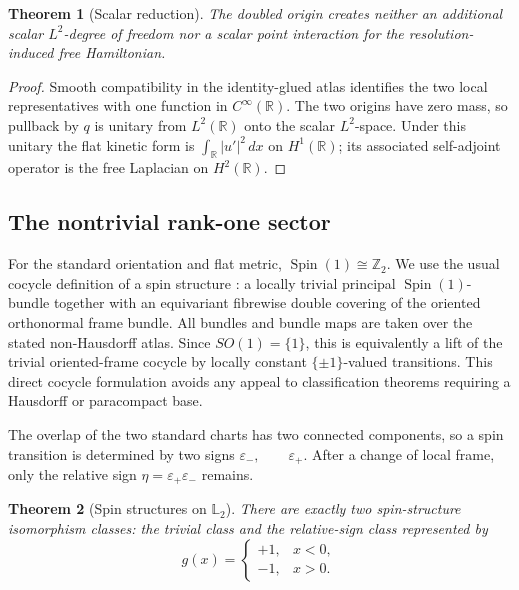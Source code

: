 \documentclass[11pt]{article}
\theoremstyle{plain}
\newtheorem{theorem}{Theorem}[section]
\theoremstyle{definition}
\newcommand{\Ltwo}{\mathbb{L}_{2}}
\begin{document}
\begin{theorem}[Scalar reduction]
\label{thm:L2-scalar-blindness}
The doubled origin creates neither an additional scalar \(L^2\)-degree of
freedom nor a scalar point interaction for the resolution-induced free
Hamiltonian.
\end{theorem}

\begin{proof}
Smooth compatibility in the identity-glued atlas identifies the two local
representatives with one function in \(C^\infty(\mathbb R)\). The two origins
have zero mass, so pullback by \(q\) is unitary from \(L^2(\mathbb R)\) onto
the scalar \(L^2\)-space. Under this unitary the flat kinetic form is
\(\int_{\mathbb R}|u'|^2\,dx\) on \(H^1(\mathbb R)\); its associated
self-adjoint operator is the free Laplacian on \(H^2(\mathbb R)\).
\end{proof}



\subsection{The nontrivial rank-one sector}
\label{subsec:L2-relative-sign}

For the standard orientation and flat metric,
\(\operatorname{Spin}(1)\cong\mathbb Z_2\).
We use the usual cocycle definition of a spin structure
\citep{LawsonMichelsohn89}: a locally trivial principal
\(\operatorname{Spin}(1)\)-bundle together with an equivariant fibrewise
double covering of the oriented orthonormal frame bundle. All bundles and
bundle maps are taken over the stated non-Hausdorff atlas. Since
\(SO(1)=\{1\}\), this is equivalently a lift of the trivial oriented-frame
cocycle by locally constant \(\{\pm1\}\)-valued transitions. This direct
cocycle formulation avoids any appeal to classification theorems requiring a
Hausdorff or paracompact base.

The overlap of the two standard charts has two connected components, so a
spin transition is determined by two signs
\(\varepsilon_-, \qquad \varepsilon_+\).
After a change of local frame, only the relative sign \(\eta=\varepsilon_+\varepsilon_-\) remains.

\begin{theorem}[Spin structures on \(\Ltwo\)]
\label{thm:L2-spin-classification}
There are exactly two spin-structure isomorphism classes: the trivial class
and the relative-sign class represented by
\[
  g(x)
  =
  \begin{cases}
    +1,&x<0,\\
    -1,&x>0.
  \end{cases}
\]
\end{theorem}
\end{document}
